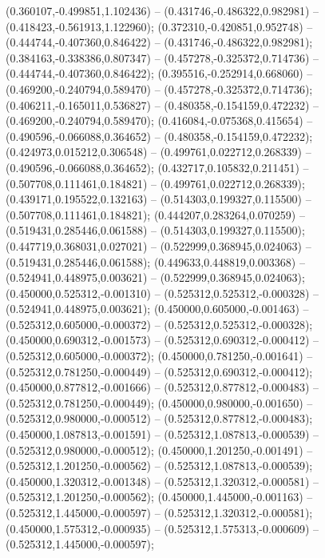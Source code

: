  (0.360107,-0.499851,1.102436) -- (0.431746,-0.486322,0.982981) -- (0.418423,-0.561913,1.122960);
 (0.372310,-0.420851,0.952748) -- (0.444744,-0.407360,0.846422) -- (0.431746,-0.486322,0.982981);
 (0.384163,-0.338386,0.807347) -- (0.457278,-0.325372,0.714736) -- (0.444744,-0.407360,0.846422);
 (0.395516,-0.252914,0.668060) -- (0.469200,-0.240794,0.589470) -- (0.457278,-0.325372,0.714736);
 (0.406211,-0.165011,0.536827) -- (0.480358,-0.154159,0.472232) -- (0.469200,-0.240794,0.589470);
 (0.416084,-0.075368,0.415654) -- (0.490596,-0.066088,0.364652) -- (0.480358,-0.154159,0.472232);
 (0.424973,0.015212,0.306548) -- (0.499761,0.022712,0.268339) -- (0.490596,-0.066088,0.364652);
 (0.432717,0.105832,0.211451) -- (0.507708,0.111461,0.184821) -- (0.499761,0.022712,0.268339);
 (0.439171,0.195522,0.132163) -- (0.514303,0.199327,0.115500) -- (0.507708,0.111461,0.184821);
 (0.444207,0.283264,0.070259) -- (0.519431,0.285446,0.061588) -- (0.514303,0.199327,0.115500);
 (0.447719,0.368031,0.027021) -- (0.522999,0.368945,0.024063) -- (0.519431,0.285446,0.061588);
 (0.449633,0.448819,0.003368) -- (0.524941,0.448975,0.003621) -- (0.522999,0.368945,0.024063);
 (0.450000,0.525312,-0.001310) -- (0.525312,0.525312,-0.000328) -- (0.524941,0.448975,0.003621);
 (0.450000,0.605000,-0.001463) -- (0.525312,0.605000,-0.000372) -- (0.525312,0.525312,-0.000328);
 (0.450000,0.690312,-0.001573) -- (0.525312,0.690312,-0.000412) -- (0.525312,0.605000,-0.000372);
 (0.450000,0.781250,-0.001641) -- (0.525312,0.781250,-0.000449) -- (0.525312,0.690312,-0.000412);
 (0.450000,0.877812,-0.001666) -- (0.525312,0.877812,-0.000483) -- (0.525312,0.781250,-0.000449);
 (0.450000,0.980000,-0.001650) -- (0.525312,0.980000,-0.000512) -- (0.525312,0.877812,-0.000483);
 (0.450000,1.087813,-0.001591) -- (0.525312,1.087813,-0.000539) -- (0.525312,0.980000,-0.000512);
 (0.450000,1.201250,-0.001491) -- (0.525312,1.201250,-0.000562) -- (0.525312,1.087813,-0.000539);
 (0.450000,1.320312,-0.001348) -- (0.525312,1.320312,-0.000581) -- (0.525312,1.201250,-0.000562);
 (0.450000,1.445000,-0.001163) -- (0.525312,1.445000,-0.000597) -- (0.525312,1.320312,-0.000581);
 (0.450000,1.575312,-0.000935) -- (0.525312,1.575313,-0.000609) -- (0.525312,1.445000,-0.000597);
